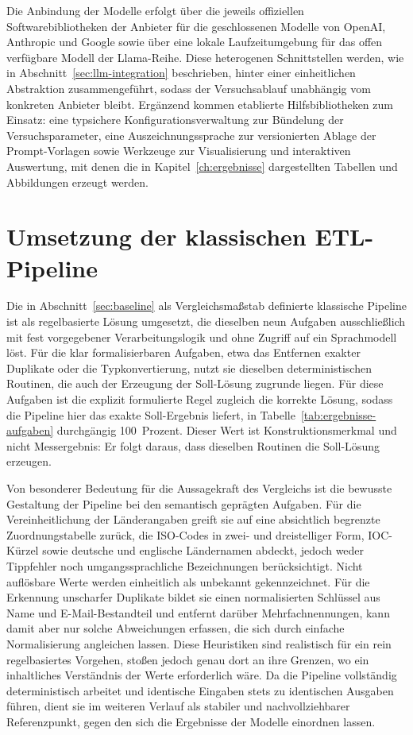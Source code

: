 Die Anbindung der Modelle erfolgt über die jeweils offiziellen Softwarebibliotheken der Anbieter für die geschlossenen Modelle von OpenAI, Anthropic und Google sowie über eine lokale Laufzeitumgebung für das offen verfügbare Modell der Llama-Reihe. Diese heterogenen Schnittstellen werden, wie in Abschnitt~\ref{sec:llm-integration} beschrieben, hinter einer einheitlichen Abstraktion zusammengeführt, sodass der Versuchsablauf unabhängig vom konkreten Anbieter bleibt. Ergänzend kommen etablierte Hilfsbibliotheken zum Einsatz: eine typsichere Konfigurationsverwaltung zur Bündelung der Versuchsparameter, eine Auszeichnungssprache zur versionierten Ablage der Prompt-Vorlagen sowie Werkzeuge zur Visualisierung und interaktiven Auswertung, mit denen die in Kapitel~\ref{ch:ergebnisse} dargestellten Tabellen und Abbildungen erzeugt werden.

\section{Umsetzung der klassischen ETL-Pipeline}
\label{sec:klassische-pipeline}

Die in Abschnitt~\ref{sec:baseline} als Vergleichsmaßstab definierte klassische Pipeline ist als regelbasierte Lösung umgesetzt, die dieselben neun Aufgaben ausschließlich mit fest vorgegebener Verarbeitungslogik und ohne Zugriff auf ein Sprachmodell löst. Für die klar formalisierbaren Aufgaben, etwa das Entfernen exakter Duplikate oder die Typkonvertierung, nutzt sie dieselben deterministischen Routinen, die auch der Erzeugung der Soll-Lösung zugrunde liegen. Für diese Aufgaben ist die explizit formulierte Regel zugleich die korrekte Lösung, sodass die Pipeline hier das exakte Soll-Ergebnis liefert, in Tabelle~\ref{tab:ergebnisse-aufgaben} durchgängig 100~Prozent. Dieser Wert ist Konstruktionsmerkmal und nicht Messergebnis: Er folgt daraus, dass dieselben Routinen die Soll-Lösung erzeugen.

Von besonderer Bedeutung für die Aussagekraft des Vergleichs ist die bewusste Gestaltung der Pipeline bei den semantisch geprägten Aufgaben. Für die Vereinheitlichung der Länderangaben greift sie auf eine absichtlich begrenzte Zuordnungstabelle zurück, die ISO-Codes in zwei- und dreistelliger Form, IOC-Kürzel sowie deutsche und englische Ländernamen abdeckt, jedoch weder Tippfehler noch umgangssprachliche Bezeichnungen berücksichtigt. Nicht auflösbare Werte werden einheitlich als unbekannt gekennzeichnet. Für die Erkennung unscharfer Duplikate bildet sie einen normalisierten Schlüssel aus Name und E-Mail-Bestandteil und entfernt darüber Mehrfachnennungen, kann damit aber nur solche Abweichungen erfassen, die sich durch einfache Normalisierung angleichen lassen. Diese Heuristiken sind realistisch für ein rein regelbasiertes Vorgehen, stoßen jedoch genau dort an ihre Grenzen, wo ein inhaltliches Verständnis der Werte erforderlich wäre. Da die Pipeline vollständig deterministisch arbeitet und identische Eingaben stets zu identischen Ausgaben führen, dient sie im weiteren Verlauf als stabiler und nachvollziehbarer Referenzpunkt, gegen den sich die Ergebnisse der Modelle einordnen lassen.

